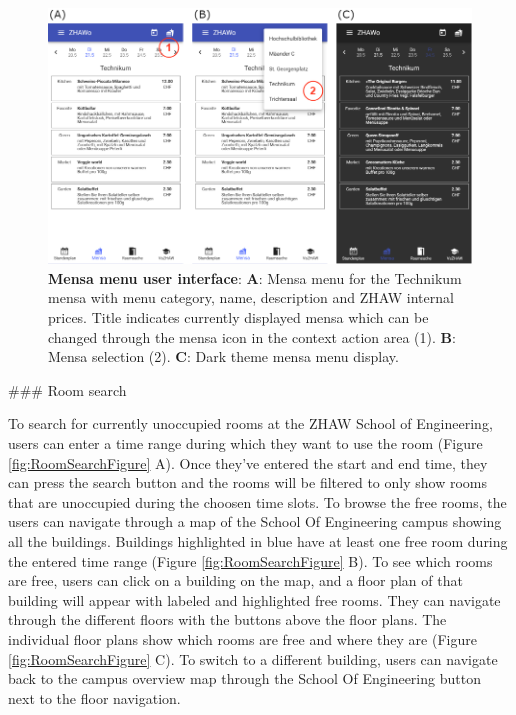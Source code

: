\begin{markdown}
\begin{figure}[H]
  \includegraphics[width=16cm, center]{./figures/menu_figure.png}
  \captionsetup{width=15.5cm}
  \caption[Mensa menu user interface]{\textbf{Mensa menu user interface}: \textbf{A}: Mensa menu for the Technikum mensa with menu category, name, description and ZHAW internal prices. Title indicates currently displayed mensa which can be changed through the mensa icon in the context action area (1). \textbf{B}: Mensa selection (2). \textbf{C}: Dark theme mensa menu display.}
  \label{fig:MenuFigure}
\end{figure}

\newpage

### Room search

To search for currently unoccupied rooms at the ZHAW School of Engineering, users can enter a time range during which they want to use the room (Figure \ref{fig:RoomSearchFigure} A). Once they've entered the start and end time, they can press the search button and the rooms will be filtered to only show rooms that are unoccupied during the choosen time slots. To browse the free rooms, the users can navigate through a map of the School Of Engineering campus showing all the buildings. Buildings highlighted in blue have at least one free room during the entered time range (Figure \ref{fig:RoomSearchFigure} B). To see which rooms are free, users can click on a building on the map, and a floor plan of that building will appear with labeled and highlighted free rooms. They can navigate through the different floors with the buttons above the floor plans. The individual floor plans show which rooms are free and where they are (Figure \ref{fig:RoomSearchFigure} C). To switch to a different building, users can navigate back to the campus overview map through the School Of Engineering button next to the floor navigation.


\end{markdown}
